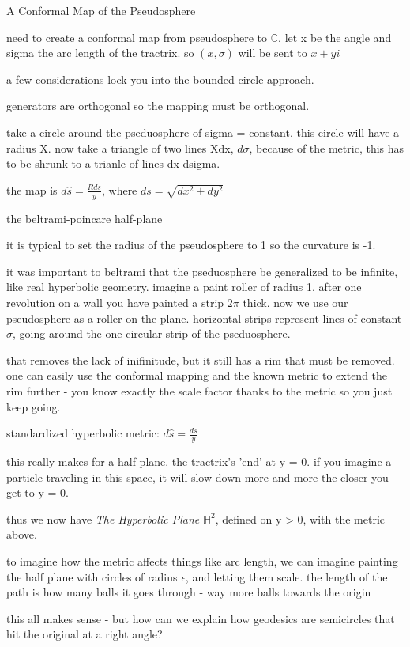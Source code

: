 \documentclass{article}
\newenvironment{andrew_section}[1]
    {
    \section{#1}
    \begin{itemize}
    }
    {
    \end{itemize}
    }
\begin{document}
\begin{andrew_section}{A Conformal Map of the Pseudosphere}
    \item 
        need to create a conformal map from pseudosphere to $\mathbb{C}$.
        let x be the angle and sigma the arc length of the tractrix.
        so $(x,\sigma)$ will be sent to $x + yi$
    \item 
        a few considerations lock you into the bounded circle approach.
    \item 
        generators are orthogonal so the mapping must be orthogonal.
    \item 
        take a circle around the pseduosphere of sigma = constant.  this
        circle will have a radius X.  now take a triangle of two lines Xdx,
        $d\sigma$, because of the metric, this has to be shrunk to a trianle of
        lines dx dsigma.
    \item 
        the map is $d\hat{s} = \frac{R ds}{y}$, where $ds = \sqrt{dx^2 + dy^2}$
\end{andrew_section}

\begin{andrew_section}{the beltrami-poincare half-plane}
    \item 
        it is typical to set the radius of the pseudosphere
        to 1 so the curvature is -1.
    \item 
        it was important to beltrami that the pseduosphere be generalized
        to be infinite, like real hyperbolic geometry.  imagine a paint roller
        of radius 1.  after one revolution on a wall you have painted a strip
        $2\pi$ thick.  now we use our pseudosphere as a roller on the plane.
        horizontal strips represent lines of constant$\sigma$, going around
        the one circular strip of the pseduosphere.
    \item 
        that removes the lack of inifinitude, but it still has a rim that
        must be removed.  one can easily use the conformal mapping and the known
        metric to extend the rim further - you know exactly the scale factor
        thanks to the metric so you just keep going.
    \item 
        standardized hyperbolic metric: $d\hat{s} = \frac{ds}{y}$
    \item 
        this really makes for a half-plane.  the tractrix's 'end' at 
        y = 0.  if you imagine a particle traveling in this space,
        it will slow down more and more the closer you get to
        y = 0.
    \item 
        thus we now have \emph{The Hyperbolic Plane} $\mathbb{H}^2$,
        defined on y > 0, with the metric above.
    \item 
        to imagine how the metric affects things like arc length,
        we can imagine painting the half plane with circles of radius
        $\epsilon$, and letting them scale.  the length of the path
        is how many balls it goes through - way more balls towards the origin
    \item   
        this all makes sense - but how can we explain how geodesics
        are semicircles that hit the original at a right angle?
\end{andrew_section}
\end{document}
